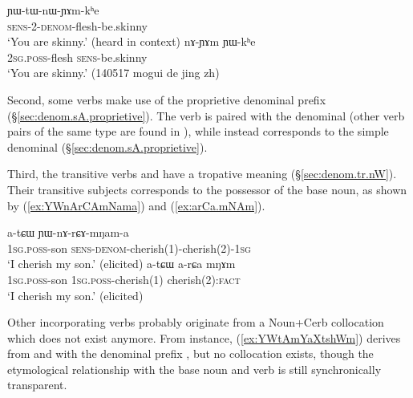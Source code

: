 \begin{exe}
\ex 
\begin{xlist}
\ex \label{ex:YWtWnWYAmkhe}
\gll ɲɯ-tɯ-nɯ-ɲɤm-kʰe \\
\textsc{sens}-2-\textsc{denom}-flesh-be.skinny \\
\glt `You are skinny.' (heard in context)
\ex \label{ex:nAYAm.YWkhe}
\gll  nɤ-ɲɤm ɲɯ-kʰe \\
\textsc{2sg}.\textsc{poss}-flesh \textsc{sens}-be.skinny \\
\glt `You are skinny.' (140517 mogui de jing zh)
\end{xlist}
\end{exe}

 

Second, some verbs make use of the   proprietive denominal prefix (§\ref{sec:denom.sA.proprietive}). The verb  is paired with the  denominal  (other verb pairs of the same type are found in ), while  instead corresponds to the simple denominal  (§\ref{sec:denom.sA.proprietive}).

Third, the transitive verbs   and  have a tropative meaning (§\ref{sec:denom.tr.nW}). Their transitive subjects corresponds to the possessor of the base noun, as shown by (\ref{ex:YWnArCAmNama}) and (\ref{ex:arCa.mNAm}).

\begin{exe}
\ex 
\begin{xlist}
\ex \label{ex:YWnArCAmNama}
\gll a-tɕɯ ɲɯ-nɤ-rɕɤ-mŋam-a \\
\textsc{1sg}.\textsc{poss}-son \textsc{sens}-\textsc{denom}-cherish(1)-cherish(2)-\textsc{1sg} \\
\glt `I cherish my son.' (elicited)
\ex \label{ex:arCa.mNAm}
\gll  a-tɕɯ a-rɕa mŋɤm \\
\textsc{1sg}.\textsc{poss}-son  \textsc{1sg}.\textsc{poss}-cherish(1)  cherish(2):\textsc{fact}   \\
\glt `I cherish my son.' (elicited)
\end{xlist}
\end{exe}

Other incorporating verbs probably originate from a Noun+Cerb collocation which does not exist anymore. From instance,  (\ref{ex:YWtAmYaXtshWm}) derives from  and  with the denominal prefix , but no collocation  exists, though the etymological relationship with the base noun and verb is still synchronically transparent.

